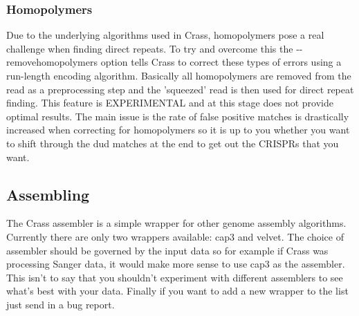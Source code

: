 \documentclass[11pt]{article} %
\begin{document}
\subsubsection{Homopolymers}
Due to the underlying algorithms used in Crass, homopolymers pose a real challenge when finding direct repeats.  To try and overcome this the -{}-removehomopolymers option tells Crass to correct these types of errors using a run-length encoding algorithm.  Basically all homopolymers are removed from the read as a preprocessing step and the 'squeezed' read is then used for direct repeat finding.  This feature is EXPERIMENTAL and at this stage does not provide optimal results.  The main issue is the rate of false positive matches is drastically increased when correcting for homopolymers so it is up to you whether you want to shift through the dud matches at the end to get out the CRISPRs that you want.  
\subsection{Assembling}
The Crass assembler is a simple wrapper for other genome assembly algorithms.  Currently there are only two wrappers available: cap3 and velvet.  The choice of assembler should be governed by the input data so for example if Crass was processing Sanger data, it would make more sense to use cap3 as the assembler.  This isn't to say that you shouldn't experiment with different assemblers to see what's best with your data.  Finally if you want to add a new wrapper to the list just send in a bug report.
\end{document}
